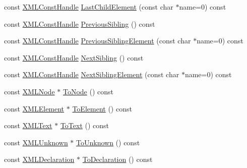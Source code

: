 \begin{DoxyCompactItemize}
\item 
const \mbox{\hyperlink{classtinyxml2_1_1_x_m_l_const_handle}{X\+M\+L\+Const\+Handle}} \mbox{\hyperlink{classtinyxml2_1_1_x_m_l_const_handle_a9de0475ec42bd50c0e64624a250ba5b2}{Last\+Child\+Element}} (const char $\ast$name=0) const
\item 
const \mbox{\hyperlink{classtinyxml2_1_1_x_m_l_const_handle}{X\+M\+L\+Const\+Handle}} \mbox{\hyperlink{classtinyxml2_1_1_x_m_l_const_handle_acf68cc7930e4ac883e0c7e16ef2fbb66}{Previous\+Sibling}} () const
\item 
const \mbox{\hyperlink{classtinyxml2_1_1_x_m_l_const_handle}{X\+M\+L\+Const\+Handle}} \mbox{\hyperlink{classtinyxml2_1_1_x_m_l_const_handle_aef99308659f2617299ac29980769a91e}{Previous\+Sibling\+Element}} (const char $\ast$name=0) const
\item 
const \mbox{\hyperlink{classtinyxml2_1_1_x_m_l_const_handle}{X\+M\+L\+Const\+Handle}} \mbox{\hyperlink{classtinyxml2_1_1_x_m_l_const_handle_aec3710e455f41014026ef17fbbb0efb3}{Next\+Sibling}} () const
\item 
const \mbox{\hyperlink{classtinyxml2_1_1_x_m_l_const_handle}{X\+M\+L\+Const\+Handle}} \mbox{\hyperlink{classtinyxml2_1_1_x_m_l_const_handle_a3c9e6b48b02d3d5232e1e8780753d8a5}{Next\+Sibling\+Element}} (const char $\ast$name=0) const
\item 
const \mbox{\hyperlink{classtinyxml2_1_1_x_m_l_node}{X\+M\+L\+Node}} $\ast$ \mbox{\hyperlink{classtinyxml2_1_1_x_m_l_const_handle_a61812760cb08bc1b050e65b73a08457b}{To\+Node}} () const
\item 
const \mbox{\hyperlink{classtinyxml2_1_1_x_m_l_element}{X\+M\+L\+Element}} $\ast$ \mbox{\hyperlink{classtinyxml2_1_1_x_m_l_const_handle_a4dba53c6e201d412e915620feaaa56f3}{To\+Element}} () const
\item 
const \mbox{\hyperlink{classtinyxml2_1_1_x_m_l_text}{X\+M\+L\+Text}} $\ast$ \mbox{\hyperlink{classtinyxml2_1_1_x_m_l_const_handle_a80e24d90d476005aa35602a665358e2d}{To\+Text}} () const
\item 
const \mbox{\hyperlink{classtinyxml2_1_1_x_m_l_unknown}{X\+M\+L\+Unknown}} $\ast$ \mbox{\hyperlink{classtinyxml2_1_1_x_m_l_const_handle_a4395e5feaba7b456a81ca274880ea3d3}{To\+Unknown}} () const
\item 
const \mbox{\hyperlink{classtinyxml2_1_1_x_m_l_declaration}{X\+M\+L\+Declaration}} $\ast$ \mbox{\hyperlink{classtinyxml2_1_1_x_m_l_const_handle_a55e306d105fa80d626041e4d3b77b716}{To\+Declaration}} () const
\end{DoxyCompactItemize}


